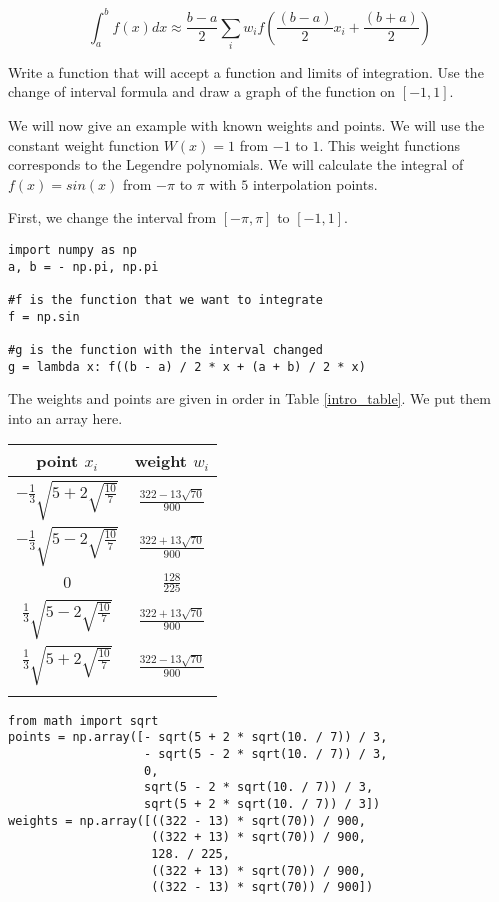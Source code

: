 \[
\int_a^b f(x) dx \approx \frac{b - a}{2} \sum_i w_if(\frac{(b-a)}{2}x_i + \frac{(b+a)}{2})
\]

\begin{problem}
Write a function that will accept a function and limits of integration.  Use the change of interval formula and draw a graph of the function on $[-1,1]$.
\end{problem}

We will now give an example with known weights and points.  We will use the constant weight function $W(x) = 1$ from $-1$ to $1$.  This weight functions corresponds to the Legendre polynomials.  We will calculate the integral of $f(x) = sin(x)$ from $-\pi$ to $\pi$ with $5$ interpolation points.

First, we change the interval from $[-\pi, \pi]$ to $[-1,1]$.

\begin{lstlisting}
import numpy as np
a, b = - np.pi, np.pi

#f is the function that we want to integrate
f = np.sin

#g is the function with the interval changed
g = lambda x: f((b - a) / 2 * x + (a + b) / 2 * x)
\end{lstlisting}

The weights and points are given in order in Table \ref{intro_table}.  We put them into an array here.
\begin{center}
\begin{tabular}{|c|c|}
\hline
point $x_i$ & weight $w_i$ \\
\hline
$-\frac{1}{3}\sqrt{5 + 2\sqrt{\frac{10}{7}}}$ &  $\frac{322-13\sqrt{70}}{900}$ \\
\hline
$-\frac{1}{3}\sqrt{5 - 2\sqrt{\frac{10}{7}}}$ & $\frac{322+13\sqrt{70}}{900}$ \\
\hline
$0$ & $\frac{128}{225}$ \\
\hline
$\frac{1}{3}\sqrt{5 - 2\sqrt{\frac{10}{7}}}$ & $\frac{322+13\sqrt{70}}{900}$ \\
\hline
$\frac{1}{3}\sqrt{5 + 2\sqrt{\frac{10}{7}}}$ & $\frac{322-13\sqrt{70}}{900}$ \\
\hline
\label{intro_table}
\end{tabular}
\end{center}
\begin{lstlisting}
from math import sqrt
points = np.array([- sqrt(5 + 2 * sqrt(10. / 7)) / 3,
                   - sqrt(5 - 2 * sqrt(10. / 7)) / 3,
                   0,
                   sqrt(5 - 2 * sqrt(10. / 7)) / 3,
                   sqrt(5 + 2 * sqrt(10. / 7)) / 3])
weights = np.array([((322 - 13) * sqrt(70)) / 900,
                    ((322 + 13) * sqrt(70)) / 900,
                    128. / 225,
                    ((322 + 13) * sqrt(70)) / 900,
                    ((322 - 13) * sqrt(70)) / 900])
\end{lstlisting}

